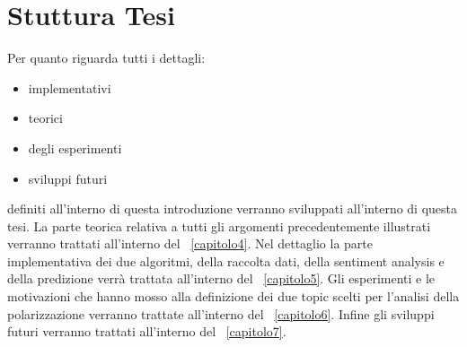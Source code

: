 \section{Stuttura Tesi}
Per quanto riguarda tutti i dettagli:
\begin{itemize}
\item implementativi
\item teorici
\item degli esperimenti
\item sviluppi futuri
\end{itemize}
definiti all'interno di questa introduzione verranno sviluppati all'interno di questa tesi.
La parte teorica relativa a tutti gli argomenti precedentemente illustrati verranno trattati all'interno del ~\ref{capitolo4}.
Nel dettaglio la parte implementativa dei due algoritmi, della raccolta dati, della sentiment analysis e della predizione verrà trattata all'interno del ~\ref{capitolo5}.
Gli esperimenti e le motivazioni  che hanno mosso alla definizione dei due topic scelti per l'analisi della polarizzazione verranno trattate all'interno del ~\ref{capitolo6}.
Infine gli sviluppi futuri verranno trattati all'interno del ~\ref{capitolo7}.
